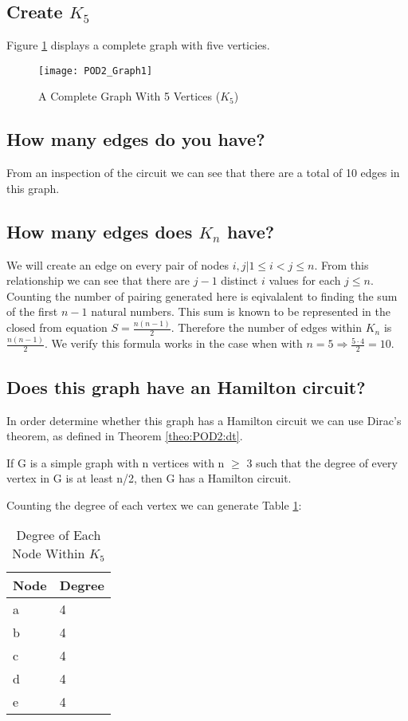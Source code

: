 \subsection{Create $K_5$}
Figure \ref{fig:K5_0} displays a complete graph with five verticies.
\begin{figure}[ht]
\centering
\texttt{[image: POD2\_Graph1]}
\caption{A Complete Graph With 5 Vertices ($K_5$)}
\label{fig:K5_0}
\end{figure}

\subsection{How many edges do you have?}
From an inspection of the circuit we can see that there are a total of 10 edges in this graph.

\subsection{How many edges does $K_n$ have?}
We will create an edge on every pair of nodes $i,j | 1 \leq i < j \leq n$. From this relationship we can see that there are $j-1$ distinct $i$ values for each $j \leq n$. Counting the number of pairing generated here is eqivalalent to finding the sum of the first $n-1$ natural numbers. This sum is known to be represented in the closed from equation $S = \frac{n(n-1)}{2}$. Therefore the number of edges within $K_n$ is $\frac{n(n-1)}{2}$. We verify this formula works in the case when with $n=5 \Rightarrow \frac{5\cdot4}{2}=10$.

\newpage
\subsection{Does this graph have an Hamilton circuit?}
In order determine whether this graph has a Hamilton circuit we can use Dirac's theorem, as defined in Theorem \ref{theo:POD2:dt}.

\begin{theo}
If G is a simple graph with n vertices with n $\geq$ 3 such that the
degree of every vertex in G is at least n/2, then G has a Hamilton circuit.
\label{theo:POD2:dt}
\end{theo}

Counting the degree of each vertex we can generate Table \ref{tab:POD2deg}:

\begin{table}[ht]
\begin{center}
\begin{tabular}{l|l}
Node & Degree \\
\hline
a & 4 \\
b & 4 \\
c & 4 \\
d & 4 \\
e & 4 \\
\end{tabular}
\end{center}
\caption{Degree of Each Node Within $K_5$}
\label{tab:POD2deg}
\end{table}

